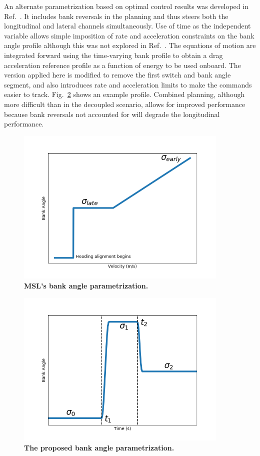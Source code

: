 \documentclass[10pt,a4paper]{article}
\begin{document}
	An alternate parametrization based on optimal control results was developed in Ref.~\cite{High Elevation Landing}. It includes bank reversals in the planning and thus steers both the longitudinal and lateral channels simultaneously. Use of time as the independent variable allows simple imposition of rate and acceleration constraints on the bank angle profile although this was not explored in Ref.~\cite{High Elevation Landing}. The equations of motion are integrated forward using the time-varying bank profile to obtain a drag acceleration reference profile as a function of energy to be used onboard. The version applied here is modified to remove the first switch and bank angle segment, and also introduces rate and acceleration limits to make the commands easier to track. Fig.~\ref{RefTrajParametrization} shows an example profile. Combined planning, although more difficult than in the decoupled scenario, allows for improved performance because bank reversals not accounted for will degrade the longitudinal performance. 
	\begin{figure}
		\centering
		\includegraphics[width=4in]{MSLProfile.png}
		\caption{\bf{MSL's bank angle parametrization.}}
		\label{MSLParametrization}
	\end{figure}
	\begin{figure}
		\centering
		\includegraphics[width=4in]{BankAngleProfile.png}
		\caption{\bf{The proposed bank angle parametrization.}}
		\label{RefTrajParametrization}
	\end{figure}
	
\end{document}
